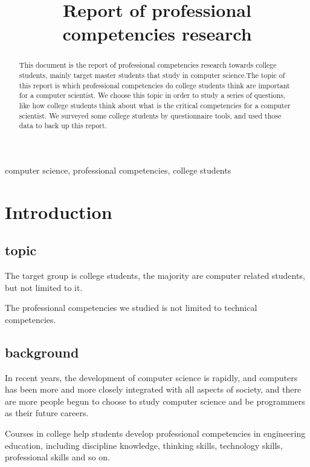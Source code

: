 \documentclass[conference]{IEEEtran}
\begin{document}
\title{Report of professional competencies research\\
}

\author{
\and
{}
\and
{}
\and
{}
}

\maketitle

\begin{abstract}
This document is the report of professional competencies research towards college students, mainly target master students that study in computer science.The topic of this report is which professional competencies do college students think are important for a computer scientist. We choose this topic in order to study a series of questions, like how college students think about what is the critical competencies for a computer scientist. We surveyed some college students by questionnaire tools, and used those data to back up this report. 
\end{abstract}

\begin{IEEEkeywords}
computer science, professional competencies, college students
\end{IEEEkeywords}

\section{Introduction}
\subsection{topic}
\par The target group is college students, the majority are computer related students, but not limited to it.
\par The professional competencies we studied is not limited to technical
competencies.

\subsection{background}
\par In recent years, the development of computer science is rapidly, and computers has been more and more closely integrated with all aspects of society, and there are more people begun to choose to study computer science and be programmers as their future careers.
\par Courses in college help students develop professional competencies in engineering education, including discipline knowledge, thinking skills, technology skills, professional skills and so on.
\end{document}
